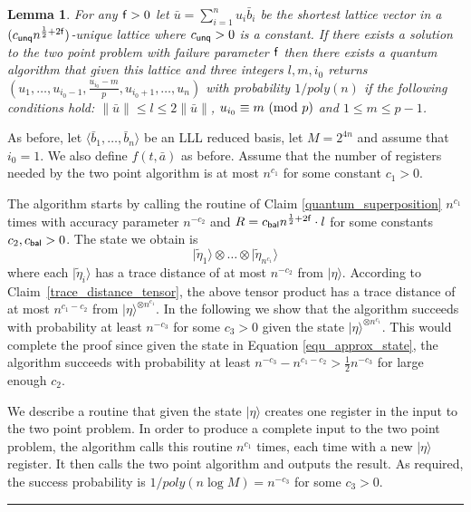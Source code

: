 \documentclass[11pt]{article}
\newtheorem{lemma}[theorem]{Lemma}
\newcommand{\qedsymb}{\hfill{\rule{2mm}{2mm}}}
\newenvironment{proof}{\begin{trivlist}
\item[\hspace{\labelsep}{\sl\noindent Proof:\/}]
}{\qedsymb\end{trivlist}}
\def\mod{{\rm mod}}
\newcommand\ket[1]{{ |{#1} \rangle }}
\newcommand\C[1]{{ c_{\sf {#1}} }}
\begin{document}
\begin{lemma}\label{improved_main_lattice_lemma}
For any ${\sf f}>0$ let $\bar{u}=\sum_{i=1}^{n} u_i \bar{b}_i$ be the shortest lattice vector in a $(\C{unq}
n^{\frac{1}{2}+2{\sf f}})$-unique lattice where $\C{unq}>0$ is a constant. If there exists a solution to the two point
problem with failure parameter ${\sf f}$ then there exists a quantum algorithm that given this lattice and three
integers $l,m,i_0$ returns $(u_1,\ldots,u_{i_0-1},\frac{u_{i_0}-m}{p},u_{i_0+1},\ldots,u_n)$ with probability
$1/poly(n)$ if the following conditions hold: $\|\bar{u}\| \le l \le 2\|\bar{u}\|$, $u_{i_0}\equiv m~(\mod~p)$ and
$1\le m\le p-1$.
\end{lemma}
\begin{proof}
As before, let $\langle \bar{b}_1,\ldots,\bar{b}_n \rangle$ be an LLL reduced basis, let $M=2^{4n}$ and assume that
$i_0=1$. We also define $f(t,\bar{a})$ as before. Assume that the number of registers needed by the two point algorithm
is at most $n^{c_1}$ for some constant $c_1>0$.

The algorithm starts by calling the routine of Claim \ref{quantum_superposition} $n^{c_1}$ times with accuracy
parameter $n^{-c_2}$ and $R=\C{bal}n^{\frac{1}{2}+2{\sf f}}\cdot l$ for some constants $c_2,\C{bal}>0$. The state we
obtain is
 \begin{equation}\label{equ_approx_state}
 \ket{\tilde{\eta}_1} \otimes \ldots \otimes \ket{\tilde{\eta}_{n^{c_1}}}
 \end{equation}
where each $\ket{\tilde{\eta}_i}$ has a trace distance of at most $n^{-c_2}$ from $\ket{\eta}$. According to
Claim~\ref{trace_distance_tensor}, the above tensor product has a trace distance of at most $n^{c_1-c_2}$ from
$\ket{\eta}^{\otimes n^{c_1}}$. In the following we show that the algorithm succeeds with probability at least
$n^{-c_3}$ for some $c_3>0$ given the state $\ket{\eta}^{\otimes n^{c_1}}$. This would complete the proof since given
the state in Equation \ref{equ_approx_state}, the algorithm succeeds with probability at least
$n^{-c_3}-n^{c_1-c_2}>\frac{1}{2}n^{-c_3}$ for large enough $c_2$.

We describe a routine that given the state $\ket{\eta}$ creates one register in the input to the two point problem. In
order to produce a complete input to the two point problem, the algorithm calls this routine $n^{c_1}$ times, each time
with a new $\ket{\eta}$ register. It then calls the two point algorithm and outputs the result. As required, the
success probability is $1/poly(n\log M)=n^{-c_3}$ for some $c_3>0$.


\end{proof}
\end{document}
